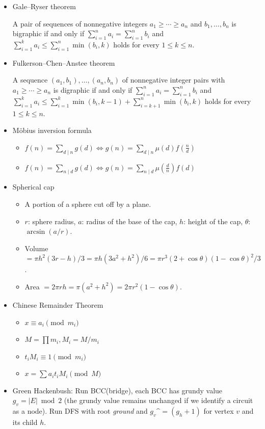 \begin{itemize}
\item Gale–Ryser theorem

A pair of sequences of nonnegative integers $a_1\ge\cdots\ge a_n$ and $b_1,\ldots,b_n$ is bigraphic if and only if $\displaystyle\sum_{i=1}^n a_i=\displaystyle\sum_{i=1}^n b_i$ and $\displaystyle\sum_{i=1}^k a_i\le \displaystyle\sum_{i=1}^n\min(b_i,k)$ holds for every $1\le k\le n$.

\item Fulkerson–Chen–Anstee theorem

A sequence $(a_1,b_1),\ldots,(a_n,b_n)$ of nonnegative integer pairs with $a_1\ge\cdots\ge a_n$ is digraphic if and only if $\displaystyle\sum_{i=1}^n a_i=\displaystyle\sum_{i=1}^n b_i$ and $\displaystyle\sum_{i=1}^k a_i\le \displaystyle\sum_{i=1}^k\min(b_i,k-1)+\displaystyle\sum_{i=k+1}^n\min(b_i,k)$ holds for every $1\le k\le n$.

\item Möbius inversion formula

\begin{itemize}
    \itemsep-0.5em
  \item $f(n)=\sum_{d\mid n}g(d)\Leftrightarrow g(n)=\sum_{d\mid n}\mu(d)f(\frac{n}{d})$
  \item $f(n)=\sum_{n\mid d}g(d)\Leftrightarrow g(n)=\sum_{n\mid d}\mu(\frac{d}{n})f(d)$
\end{itemize}

\item Spherical cap

\begin{itemize}
    \itemsep-0.5em
  \item A portion of a sphere cut off by a plane.
  \item $r$: sphere radius, $a$: radius of the base of the cap, $h$: height of the cap, $\theta$: $\arcsin(a/r)$.
  \item Volume $=\pi h^2(3r-h)/3=\pi h(3a^2+h^2)/6=\pi r^3(2+\cos\theta)(1-\cos\theta)^2/3$.
  \item Area $=2\pi rh=\pi(a^2+h^2)=2\pi r^2(1-\cos\theta)$.
\end{itemize}

\item Chinese Remainder Theorem

\begin{itemize}
  \item $x \equiv a_i \pmod {m_i}$
  \item $M = \prod m_i, M_i = M / m_i$
  \item $t_iM_i \equiv 1 \pmod {m_i}$
  \item $x = \sum a_it_iM_i \pmod M$
\end{itemize}

\item Green Hackenbush: Run BCC(bridge), each BCC has grundy value $g_v = |E| \bmod 2$ (the grundy value remains unchanged if we identify a circuit as a node). Run DFS with root \textit{ground} and $g_v \^= (g_h + 1)$ for vertex $v$ and its child $h$.  
\end{itemize}
